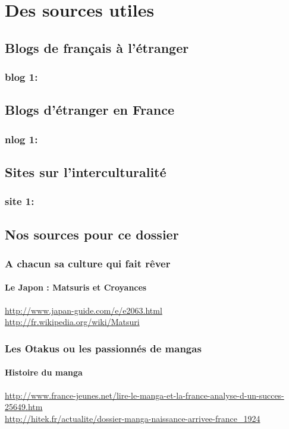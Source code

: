 \part{Des sources utiles}

\chapter{Blogs de français à l'étranger}
\section{blog 1:}


\chapter{Blogs d'étranger en France}
\section{nlog 1:}

\chapter{Sites sur l'interculturalité}
\section{site 1:}


\chapter{Nos sources pour ce dossier}
\section{A chacun sa culture qui fait rêver}
\subsection{Le Japon : Matsuris et Croyances}
\noindent
\url{http://www.japan-guide.com/e/e2063.html}\\
\url{http://fr.wikipedia.org/wiki/Matsuri}

\section{Les Otakus ou les passionnés de mangas}
\subsection{Histoire du manga}
\noindent
\url{http://www.france-jeunes.net/lire-le-manga-et-la-france-analyse-d-un-succes-25649.htm}\\
\url{http://hitek.fr/actualite/dossier-manga-naissance-arrivee-france_1924}

